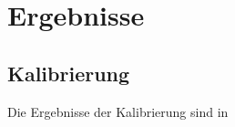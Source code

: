 \section{Ergebnisse}
\label{sec:ergebnisse}

\subsection*{Kalibrierung}
Die Ergebnisse der Kalibrierung sind in 
